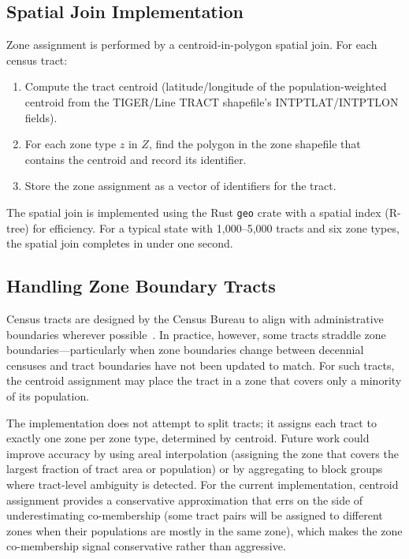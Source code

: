 \subsection{Spatial Join Implementation}

Zone assignment is performed by a centroid-in-polygon spatial join.
For each census tract:
\begin{enumerate}
  \item Compute the tract centroid (latitude/longitude of the population-weighted
    centroid from the TIGER/Line TRACT shapefile's INTPTLAT/INTPTLON fields).
  \item For each zone type $z$ in $Z$, find the polygon in the zone shapefile that
    contains the centroid and record its identifier.
  \item Store the zone assignment as a vector of identifiers for the tract.
\end{enumerate}
The spatial join is implemented using the Rust \texttt{geo} crate with a spatial
index (R-tree) for efficiency.
For a typical state with 1,000--5,000 tracts and six zone types, the spatial join
completes in under one second.

\subsection{Handling Zone Boundary Tracts}

Census tracts are designed by the Census Bureau to align with administrative boundaries
wherever possible~\citep{census2020tiger}.
In practice, however, some tracts straddle zone boundaries---particularly when zone
boundaries change between decennial censuses and tract boundaries have not been
updated to match.
For such tracts, the centroid assignment may place the tract in a zone that covers
only a minority of its population.

The implementation does not attempt to split tracts; it assigns each tract to exactly
one zone per zone type, determined by centroid.
Future work could improve accuracy by using areal interpolation (assigning the zone
that covers the largest fraction of tract area or population) or by aggregating to
block groups where tract-level ambiguity is detected.
For the current implementation, centroid assignment provides a conservative
approximation that errs on the side of underestimating co-membership (some tract
pairs will be assigned to different zones when their populations are mostly in the
same zone), which makes the zone co-membership signal conservative rather than
aggressive.
